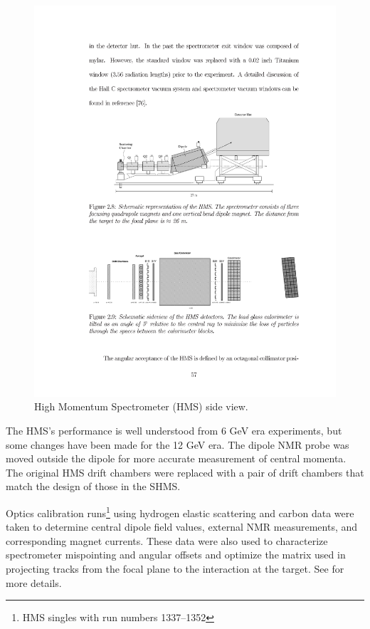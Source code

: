 \begin{figure}[!ht]
    \centering
    \includegraphics[width=1.0\textwidth]{chap3/hms_schematic.pdf}
    \caption{High Momentum Spectrometer (HMS) side view.}
    \label{fig:hms_schematic}
\end{figure}

The HMS's performance is well understood from 6 GeV era experiments, but
some changes have been made for the 12 GeV era.
The dipole NMR probe was moved outside the dipole for more accurate measurement
of central momenta.
The original HMS drift chambers were replaced with a pair of drift chambers
that match the design of those in the SHMS.

Optics calibration runs\footnote{HMS singles with run numbers 1337–1352}
using hydrogen elastic scattering and carbon data were taken to determine
central dipole field values, external NMR measurements, and corresponding
magnet currents.
These data were also used to characterize spectrometer mispointing and angular
offsets and optimize the matrix used in projecting tracks from the focal
plane to the interaction at the target.
See \cite{Holly_HMS_Optics} for more details.

